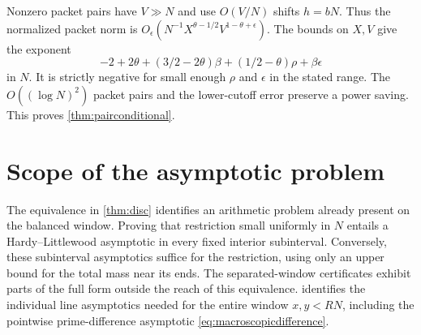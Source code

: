 \documentclass[11pt,a4paper]{article}
\numberwithin{equation}{section}
\begin{document}
Nonzero packet pairs have $V\gg N$ and use $O(V/N)$ shifts
$h=bN$. Thus the normalized packet norm is
$O_\epsilon(N^{-1}X^{\theta-1/2}V^{1-\theta+\epsilon})$.
The bounds on $X,V$ give the exponent
\[
 -2+2\theta+(3/2-2\theta)\beta
            +(1/2-\theta)\rho+\beta\epsilon
\]
in $N$. It is strictly negative for small enough $\rho$
and $\epsilon$ in the stated range. The $O((\log N)^2)$
packet pairs and the lower-cutoff error preserve a power
saving. This proves \cref{thm:pairconditional}.

\clearpage
\section{Scope of the asymptotic problem}

The equivalence in \cref{thm:disc} identifies an arithmetic problem
already present on the balanced window. Proving that restriction
small uniformly in $N$ entails a Hardy--Littlewood asymptotic in
every fixed interior subinterval. Conversely, these subinterval
asymptotics suffice for the restriction, using only an upper bound
for the total mass near its ends. The separated-window certificates
exhibit parts of the full form outside the reach of this equivalence.
 identifies the individual line
asymptotics needed for the entire window $x,y<RN$, including
the pointwise prime-difference asymptotic
\eqref{eq:macroscopicdifference}.
\end{document}
